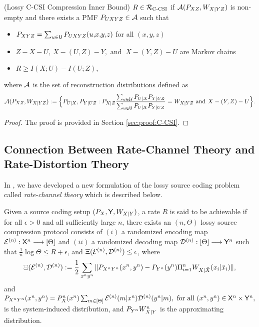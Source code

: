 \begin{theorem}\label{thm:C-CSI}(Lossy C-CSI Compression Inner Bound)
    $R\in \mathcal{R}_{\text{C-CSI}}$ if $\mathcal{A}(P_{XZ},W_{X|YZ})$ is non-empty and there exists a PMF $P_{UXYZ} \in \mathcal{A}$ such that 
    \begin{itemize}
        \item $P_{XYZ} = \sum_{u\in \mathsf{U}}P_{UXYZ}(u,\!x,\!y,\!z)$ for all $(x,\!y,\!z)$
        \item $Z-X-U, \ X-(U,Z)-Y,\text{ and } \ X-(Y,Z)-U$ are Markov chains
        \item $R\geq I(X;U)-I(U;Z),$
    \end{itemize}  
    where $\mathcal{A}$ is the set of reconstruction distributions defined as 
    $$\mathcal{A}(P_{XZ},W_{X|YZ}):= \Big\{P_{U|X}, P_{Y|UZ}:P_{X|Z} \frac{\sum_{u\in\mathcal{U}}P_{U|X}P_{Y|UZ}}{\sum_{u\in\mathsf{U}}P_{U|X}P_{Y|UZ}} = W_{X|YZ} \text{ and } X-(Y,Z)-U \Big\}.$$
\end{theorem}
\begin{proof}
    The proof is provided in Section \ref{sec:proof:C-CSI}.
\end{proof}


\subsection{Connection Between Rate-Channel Theory and Rate-Distortion Theory}
In \cite{sohail2023unique}, we have developed a new formulation of the lossy source coding problem called \textit{rate-channel theory} which is described below. 
\begin{definition}
    [Achievability]\label{def:clserror_constraint} Given a source coding setup $({P}_X,\mathsf{Y},W_{X|Y})$,
a rate $R$ is said to be achievable if for all $\epsilon >0$ and all sufficiently large $n$, there exists an 
$(n,\Theta)$ lossy source compression protocol consists of  $(i)$ a randomized encoding map $\mathcal{E}^{(n)}:\mathsf{X}^n \longrightarrow [\Theta]$ and 
$(ii)$ a randomized decoding map $\mathcal{D}^{(n)}:[\Theta] \longrightarrow {\mathsf{Y}}^n$ such that $\frac{1}{n}\log \Theta \leq R + \epsilon$, and $\Xi(\mathcal{E}^{(n)},\mathcal{D}^{(n)}) \leq \epsilon$, where 
\begin{equation}\label{def:error_constraint}
  \Xi(\mathcal{E}^{(n)},\mathcal{D}^{(n)}):= \frac{1}{2}\sum_{x^n y^n}\|{P_{X^nY^n}(x^n,y^n) -
    P_{Y^n}(y^n)
    \\
    \Pi_{i=1}^n{W}_{X|\hat{X}}(x_i|\hat{x}_i)}\|,
\end{equation}
and
$
P_{X^nY^n}(x^n,y^n) =  {{P}_X^n(x^n)} \sum_{m \in [\Theta]} \mathcal{E}^{(n)}(m|x^n) \mathcal{D}^{(n)}(y^n|m), 
\text{  for all  } (x^n, y^n)\in \mathsf{X}^n \times {\mathsf{Y}}^n,$ is the system-induced distribution,
 and $P_{Y^n}W_{X|Y}^n$ is the approximating distribution.
\end{definition}

